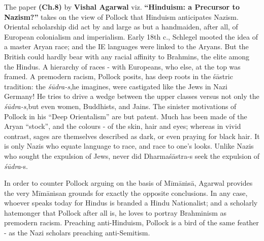 The paper \textbf{(Ch.8)} by \textbf{Vishal Agarwal} viz. \textbf{“Hinduism: a Precursor to Nazism?”} takes on the view of Pollock that Hinduism anticipates Nazism. Oriental scholarship did act by and large as but a handmaiden, after all, of European colonialism and imperialism. Early 18th c., Schlegel mooted the idea of a master Aryan race; and the IE languages were linked to the Aryans. But the British could hardly bear with any racial affinity to Brahmins, the elite among the Hindus. A hierarchy of races - with Europeans, who else, at the top was framed. A premodern racism, Pollock posits, has deep roots in the śāstric tradition: the \textit{śūdra-s},\break he imagines, were castigated like the Jews in Nazi Germany! He tries to drive a wedge between the upper classes versus not only the \textit{śūdra-s},\break but even women, Buddhists, and Jains. The sinister motivations of Pollock in his “Deep Orientalism” are but patent. Much has been made of the Aryan “stock”, and the colours - of the skin, hair and eyes; whereas in vivid contrast, sages are themselves described as dark, or even praying for black hair. It is only Nazis who equate language to race, and race to one’s looks. Unlike Nazis who sought the expulsion of Jews, never did Dharmaśāstra-s seek the expulsion of \textit{śūdra}-s.

In order to counter Pollock arguing on the basis of Mīmāṁsā, Agarwal provides the very Mīmāṁsan grounds for exactly the opposite conclusions. In any case, whoever speaks today for Hindus is branded a Hindu Nationalist; and a scholarly hatemonger that Pollock after all is, he loves to portray Brahminism as premodern racism. Preaching anti-Hinduism, Pollock is a bird of the same feather - as the Nazi scholars preaching anti-Semitism.

